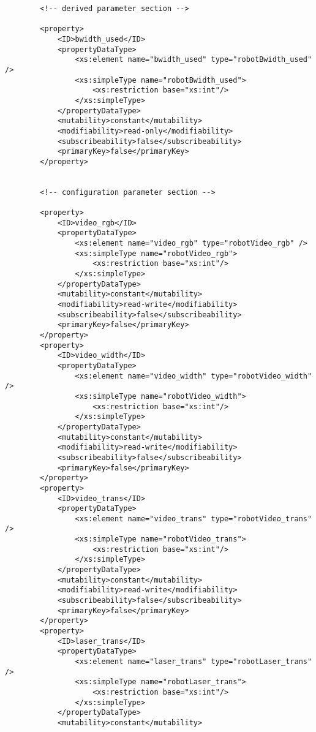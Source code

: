 \documentclass{aslreport}
\begin{document}
{\begin{verbatim}
		<!-- derived parameter section -->
		
		<property>
			<ID>bwidth_used</ID>
			<propertyDataType>
				<xs:element name="bwidth_used" type="robotBwidth_used" />
				<xs:simpleType name="robotBwidth_used">
					<xs:restriction base="xs:int"/>
				</xs:simpleType>
			</propertyDataType>
			<mutability>constant</mutability>
			<modifiability>read-only</modifiability>
			<subscribeability>false</subscribeability>
			<primaryKey>false</primaryKey>
		</property>


		<!-- configuration parameter section -->
		
		<property>
            <ID>video_rgb</ID>
            <propertyDataType>
                <xs:element name="video_rgb" type="robotVideo_rgb" />
                <xs:simpleType name="robotVideo_rgb">
                    <xs:restriction base="xs:int"/>
                </xs:simpleType>
            </propertyDataType>
            <mutability>constant</mutability>
            <modifiability>read-write</modifiability>
            <subscribeability>false</subscribeability>
            <primaryKey>false</primaryKey>
        </property>
        <property>
            <ID>video_width</ID>
            <propertyDataType>
                <xs:element name="video_width" type="robotVideo_width" />
                <xs:simpleType name="robotVideo_width">
                    <xs:restriction base="xs:int"/>
                </xs:simpleType>
            </propertyDataType>
            <mutability>constant</mutability>
            <modifiability>read-write</modifiability>
            <subscribeability>false</subscribeability>
            <primaryKey>false</primaryKey>
        </property>
        <property>
            <ID>video_trans</ID>
            <propertyDataType>
                <xs:element name="video_trans" type="robotVideo_trans" />
                <xs:simpleType name="robotVideo_trans">
                    <xs:restriction base="xs:int"/>
                </xs:simpleType>
            </propertyDataType>
            <mutability>constant</mutability>
            <modifiability>read-write</modifiability>
            <subscribeability>false</subscribeability>
            <primaryKey>false</primaryKey>
        </property>
        <property>
            <ID>laser_trans</ID>
            <propertyDataType>
                <xs:element name="laser_trans" type="robotLaser_trans" />
                <xs:simpleType name="robotLaser_trans">
                    <xs:restriction base="xs:int"/>
                </xs:simpleType>
            </propertyDataType>
            <mutability>constant</mutability>

\end{verbatim}}
\end{document}
